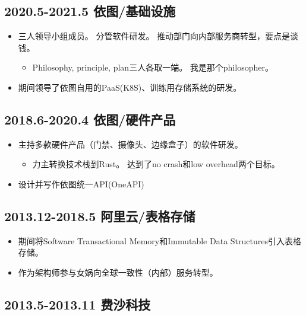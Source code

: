 \documentclass[scheme=plain]{ctexart}
\begin{document}
\subsection*{2020.5-2021.5 依图/基础设施}

\begin{itemize}
    \item 三人领导小组成员。
        分管软件研发。
        推动部门向内部服务商转型，要点是谈钱。
        \begin{itemize}
            \item Philosophy, principle, plan三人各取一端。
                我是那个philosopher。
        \end{itemize}
    \item 期间领导了依图自用的PaaS(K8S)、训练用存储系统的研发。
\end{itemize}

\subsection*{2018.6-2020.4 依图/硬件产品}

\begin{itemize}
    \item 主持多款硬件产品（门禁、摄像头、边缘盒子）的软件研发。
        \begin{itemize}
            \item 力主转换技术栈到Rust。
                达到了no crash和low overhead两个目标。
        \end{itemize}
    \item 设计并写作依图统一API(OneAPI)
\end{itemize}

\subsection*{2013.12-2018.5 阿里云/表格存储}

\begin{itemize}
    \item 期间将Software Transactional Memory和Immutable Data Structures引入表格存储。
    \item 作为架构师参与女娲向全球一致性（内部）服务转型。
\end{itemize}

\subsection*{2013.5-2013.11 费沙科技}
\end{document}
